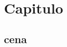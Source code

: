 \documentclass[main.tex]{subfiles}
\begin{document}
\chapter{Capitulo}

\section{cena}
\end{document}
